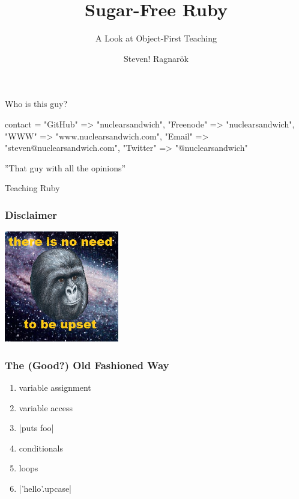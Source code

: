 \documentclass[20pt]{beamer}
\author{Steven! Ragnarök}
\title{Sugar-Free Ruby}
\subtitle{A Look at Object-First Teaching}
\begin{document}
\begin{frame}
	\titlepage
\end{frame}

\begin{frame}[fragile]
	\begin{center}
		{Who is this guy?}
		\vspace{1cm}

		\insertauthor
	\end{center}
	\begin{ruby10pt}
contact = {
  "GitHub"   =>        "nuclearsandwich",
  "Freenode" =>        "nuclearsandwich",
  "WWW"      =>    "www.nuclearsandwich.com",
  "Email"    => "steven@nuclearsandwich.com",
  "Twitter"  =>       "@nuclearsandwich"
}
	\end{ruby10pt}

	\begin{center}
		''That guy with all the opinions''
	\end{center}
\end{frame}

\begin{frame}
	\par { Teaching Ruby}
\end{frame}

\begin{frame}
\begin{center}
	\frametitle{Disclaimer}
	\includegraphics[width=5cm]{gorilla}
\end{center}
\end{frame}


\begin{frame}
	\frametitle{The (Good?) Old Fashioned Way}
	\begin{enumerate}
		\item variable assignment
		\item variable access
		\item \ruby|puts foo|
		\item conditionals
		\item loops
		\item \ruby|'hello'.upcase|
	\end{enumerate}
\end{frame}
\end{document}
